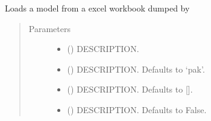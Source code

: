 \documentclass[letterpaper,10pt,english]{sphinxmanual}
\begin{document}
\begin{fulllineitems}
\begin{fulllineitems}
\begin{quote}
\begin{description}
\end{description}\end{quote}

\end{fulllineitems}


\begin{fulllineitems}
\label{\detokenize{core/modelclass:modelclass.Excel_Mixin.modelload_excel}}
\pysigstartsignatures
{}
\pysigstopsignatures
\sphinxAtStartPar
Loads a model from a excel workbook dumped by {\hyperref[\detokenize{core/modelclass:modelclass.Excel_Mixin.modeldump_excel}]{}}
\begin{quote}\begin{description}
\item[{Parameters}] \leavevmode\begin{itemize}
\item {} 
\sphinxAtStartPar
{} () \textendash{} DESCRIPTION.

\item {} 
\sphinxAtStartPar
{} (\sphinxstyleliteralemphasis{\sphinxupquote{, }}) \textendash{} DESCRIPTION. Defaults to ‘pak’.

\item {} 
\sphinxAtStartPar
{} (\sphinxstyleliteralemphasis{\sphinxupquote{, }}) \textendash{} DESCRIPTION. Defaults to {[}{]}.

\item {} 
\sphinxAtStartPar
{} (\sphinxstyleliteralemphasis{\sphinxupquote{, }}) \textendash{} DESCRIPTION. Defaults to False.


\end{itemize}
\end{description}
\end{quote}
\end{fulllineitems}
\end{fulllineitems}
\end{document}
